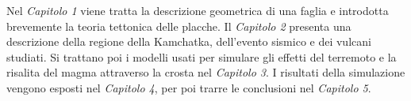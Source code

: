 Nel \textit{Capitolo 1} viene tratta la descrizione geometrica di una faglia e introdotta brevemente la teoria tettonica delle placche.
Il \textit{Capitolo 2} presenta una descrizione della regione della Kamchatka, dell'evento sismico e dei vulcani studiati.
Si trattano poi i modelli usati per simulare gli effetti del terremoto e la risalita del magma attraverso la crosta nel \textit{Capitolo 3}. I risultati della simulazione vengono esposti nel \textit{Capitolo 4}, per poi trarre le conclusioni nel \textit{Capitolo 5}.



